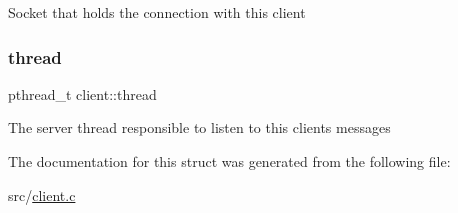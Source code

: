 Socket that holds the connection with this client \mbox{\label{structclient_a529fa20e309347262616a00ad0ad3d93}} 
\subsubsection{\texorpdfstring{thread}{thread}}
{\footnotesize\ttfamily pthread\+\_\+t client\+::thread}

The server thread responsible to listen to this client\textquotesingle{}s messages 

The documentation for this struct was generated from the following file\+:\begin{DoxyCompactItemize}
\item 
src/\hyperlink{client_8c}{client.\+c}\end{DoxyCompactItemize}
